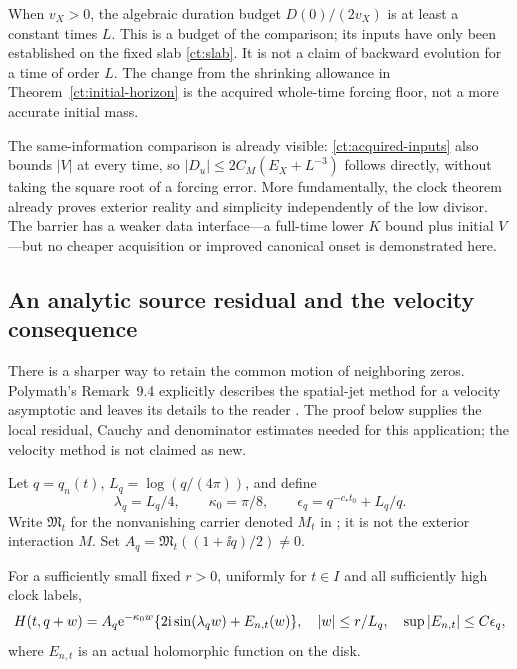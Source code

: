 When $v_X>0$, the algebraic duration budget $D(0)/(2v_X)$ is at
least a constant times $L$. This is a budget of the comparison; its
inputs have only been established on the fixed slab \eqref{ct:slab}.
It is not a claim of backward evolution for a time of order $L$.
The change from the shrinking allowance in
Theorem~\ref{ct:initial-horizon} is the acquired whole-time forcing
floor, not a more accurate initial mass.

The same-information comparison is already visible:
\eqref{ct:acquired-inputs} also bounds $|V|$ at every time, so
$|D_u|\le2C_M(E_X+L^{-3})$ follows directly, without taking the
square root of a forcing error. More fundamentally, the clock theorem
already proves exterior reality and simplicity independently of the
low divisor. The barrier has a weaker data interface---a full-time
lower $K$ bound plus initial $V$---but no cheaper acquisition or
improved canonical onset is demonstrated here.

\subsection{An analytic source residual and the velocity consequence}

There is a sharper way to retain the common motion of neighboring
zeros. Polymath's Remark~9.4 explicitly describes the spatial-jet
method for a velocity asymptotic and leaves its details to the reader
\cite{Polymath2019DBN}. The proof below supplies the local residual,
Cauchy and denominator estimates needed for this application; the
velocity method is not claimed as new.

Let $q=q_n(t)$, $L_q=\log(q/(4\pi))$, and define
\begin{equation}
 \lambda_q=L_q/4,\qquad \kappa_0=\pi/8,\qquad
 \epsilon_q=q^{-c_*t_0}+L_q/q.
 \label{ct:jet-scale}
\end{equation}
Write $\mathfrak M_t$ for the nonvanishing carrier denoted $M_t$ in
\cite{Polymath2019DBN}; it is not the exterior interaction $M$.
Set $A_q=\mathfrak M_t((1+\ii q)/2)\ne0$.

\begin{lemma}
\label{ct:analytic-residual}
For a sufficiently small fixed $r>0$, uniformly for $t\in I$ and
all sufficiently high clock labels,
\begin{equation}
 H(t,q+w)=A_q\mathrm e^{-\kappa_0w}
          \{2\mathrm i\sin(\lambda_qw)+E_{n,t}(w)\},
 \quad |w|\le r/L_q,
 \quad \sup|E_{n,t}|\le C\epsilon_q,
 \label{ct:residual}
\end{equation}
where $E_{n,t}$ is an actual holomorphic function on the disk.
\end{lemma}

